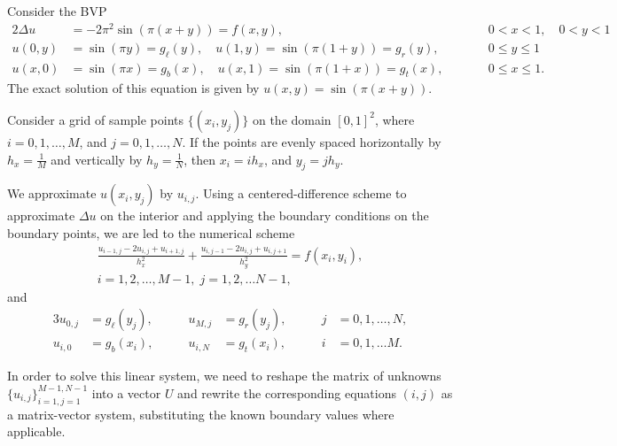 \documentclass{homework}
\begin{document}
	\maketitle
	
	\question Consider the BVP
	\begin{alignat*}{2}
		\Delta u &= -2\pi^2\sin(\pi(x+y)) = f(x,y), &\qquad &0<x<1, \quad 0<y<1 \\
		u(0,y) &= \sin(\pi y) = g_\ell(y), \quad u(1, y) = \sin(\pi(1+y)) = g_r(y), & \qquad &0 \le y \le 1\\
		u(x,0) &= \sin(\pi x) = g_b(x), \quad u(x, 1) = \sin(\pi(1+x)) = g_t(x), & \qquad &0 \le x \le 1. 
	\end{alignat*}
	The exact solution of this equation is given by $u(x,y) = \sin(\pi(x+y))$.
	
	\begin{alphaparts}
		\questionpart Consider a grid of sample points $\{(x_i, y_j)\}$ on the domain $[0,1]^2$, where $i = 0,1,\dots, M$, and $j = 0,1,\dots, N$. If the points are evenly spaced horizontally by $h_x = \frac{1}{M}$ and vertically by $h_y = \frac{1}{N}$, then $x_i = ih_x$, and $y_j = jh_y$.
		
		We approximate $u(x_i,y_j)$ by $u_{i,j}$. Using a centered-difference scheme to approximate $\Delta u$ on the interior and applying the boundary conditions on the boundary points, we are led to the numerical scheme
		\begin{equation*}
			\tag{$i,j$}
			\begin{split}
				\frac{u_{i-1,j} - 2u_{i,j} + u_{i+1,j}}{h_x^2} + \frac{u_{i,j-1} -2 u_{i,j} + u_{i,j+1}}{h_y^2} = f(x_i, y_i),\\  i=1,2,\dots, M-1,\; j=1,2,\dots N-1,
			\end{split}
		\end{equation*}
		and
		\begin{alignat*}{3}
			u_{0,j} &= g_\ell(y_j),& \qquad u_{M,j} &= g_r(y_j),& \qquad j&=0,1,\dots,N,\\
			u_{i,0} &= g_b(x_i), & \qquad u_{i,N} &= g_t(x_i),& \qquad i&=0,1,\dots M.
		\end{alignat*}
		
		
		
		In order to solve this linear system, we need to reshape the matrix of unknowns $\{u_{i,j}\}_{i=1,j=1}^{M-1,N-1}$ into a vector $U$ and rewrite the corresponding equations $(i,j)$ as a matrix-vector system, substituting the known boundary values where applicable.
		

\end{alphaparts}
\end{document}
